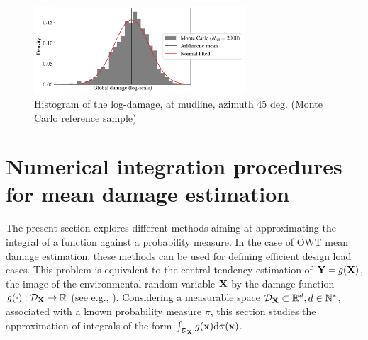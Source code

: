 \begin{figure}[!h]
\begin{center}
    \includegraphics[width=0.7\textwidth]{part2/figures/DCE/teesside/reference_log_histogramNode1_45.pdf}
\end{center}
\caption{Histogram of the log-damage, at mudline, azimuth 45 deg. (Monte Carlo reference sample)}
\label{fig:histo_mc}
\end{figure}

\section{Numerical integration procedures for mean damage estimation}\label{sec:sec43}
The present section explores different methods aiming at approximating the integral of a function against a probability measure. 
In the case of OWT mean damage estimation, these methods can be used for defining efficient design load cases. 
This problem is equivalent to the central tendency estimation of ${\bf Y} = g({\bf X})$, the image of the environmental random variable ${\bf X}$ by the damage function $g(\cdot): \mathcal{D}_{\bf X} \to \mathbb{R}$ (see e.g., ). 
Considering a measurable space $\mathcal{D}_{\bf X} \subset \mathbb{R}^d, d \in \mathbb{N}^*$, associated with a known probability measure $\pi$, this section studies the approximation of integrals of the form $\int_{\mathcal{D}_{\bf X}} g({\bf x}) \mathrm{d}\pi({\bf x})$. 
